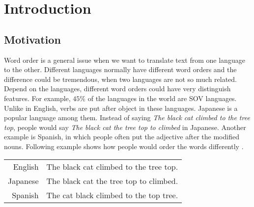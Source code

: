 
\chapter{Introduction}
\label{ch:Introduction}

\section{Motivation}
\label{ch:Introduction:sec:Motivation}

Word order is a general issue when we want to translate text from one language to the other. Different languages normally have different word orders and the difference could be tremendous, when two languages are not so much related. Depend on the languages, different word orders could have very distinguish features. For example, $45\%$ of the languages in the world are \ac{SOV} languages. Unlike in English, verbs are put after object in these languages. Japanese is a popular language among them. Instead of saying \emph{The black cat climbed to the tree top}, people would say \emph{The black cat the tree top to climbed} in Japanese. Another example is Spanish, in which people often put the adjective after the modified nouns. Following example shows how people would order the words differently \citep{google}.


\begin{center}
\begin{tabular}{ r l }
English & The black cat climbed to the tree top. \\
Japanese & The black cat the tree top to climbed. \\
Spanish & The cat black climbed to the top tree. \\
\end{tabular}
\end{center}

